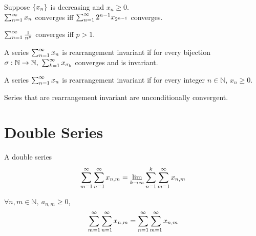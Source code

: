 	\begin{theorem}
		Suppose $\sequence{x_n}$ is decreasing and $x_n \ge 0$.\\
		$\series{x_n}{n}$ converges iff $\series{2^{n-1}x_{2^{n-1}}}{n}$ converges.
	\end{theorem}

	\begin{corollary}
		$\series{\frac{1}{n^p}}{n}$ converges iff $p > 1$.
	\end{corollary}
	

	\begin{definition}
		A series $\series{x_n}{n}$ is rearrangement invariant if for every bijection $\sigma : \mathbb{N} \to \mathbb{N},\ \series{x_{\sigma_k}}{k}$ converges and is invariant.
	\end{definition}

	\begin{theorem}
		A series $\series{x_n}{n}$ is rearrangement invariant if for every integer $n \in \mathbb{N}$, $x_n \ge 0$.
	\end{theorem}

	\begin{remark}
		Series that are rearrangement invariant are unconditionally convergent.
	\end{remark}

\section{Double Series}
	\begin{definition}
		A double series $$\doubleseries{x_{n,m}}{m}{n} = \lim_{k \to \infty} \sum_{n=1}^k \series{x_{n,m}}{m}$$
	\end{definition}

	\begin{theorem}
		$\forall n,m \in \mathbb{N},\ a_{n,m} \ge 0$, $$\doubleseries{x_{n,m}}{m}{n} = \doubleseries{x_{n,m}}{n}{m}$$
	\end{theorem}

